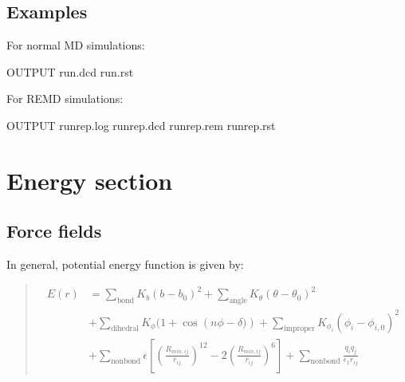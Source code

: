 \documentclass[a4paper,11pt,oneside,english]{sphinxmanual}
\begin{document}
\section{Examples}
\label{\detokenize{04_Output:examples}}
For normal MD simulations:

\begin{sphinxVerbatim}[commandchars=\\\{\}]
\PYG{o}{[}OUTPUT\PYG{o}{]}
  run.dcd
  run.rst
\end{sphinxVerbatim}

For REMD simulations:

\begin{sphinxVerbatim}[commandchars=\\\{\}]
\PYG{o}{[}OUTPUT\PYG{o}{]}
  run\PYGZus{}rep.log
  run\PYGZus{}rep.dcd
  run\PYGZus{}rep.rem
  run\PYGZus{}rep.rst
\end{sphinxVerbatim}


\chapter{Energy section}
\label{\detokenize{05_Energy:energy-section}}\label{\detokenize{05_Energy:energy}}\label{\detokenize{05_Energy::doc}}

\section{Force fields}
\label{\detokenize{05_Energy:force-fields}}
In general, potential energy function is given by:
\begin{quote}

\vspace{-5mm}
\begin{equation*}
\begin{split}E(r) & = \sum_{\mathrm{bond}}K_b(b-b_0)^2+\sum_{\mathrm{angle}}K_{\theta}(\theta-\theta_0)^2  \\
     & + \sum_{\mathrm{dihedral}}K_{\phi}(1+\cos\left(n\phi-\delta)\right)+\sum_{\mathrm{improper}}K_{\phi_i}(\phi_i-\phi_{i,0})^2 \\
     & + \sum_{\mathrm{nonbond}}\epsilon\left[\left(\frac{R_{min,ij}}{r_{ij}}\right)^{12}-2\left(\frac{R_{min,ij}}{r_{ij}}\right)^6\right]+\sum_{\mathrm{nonbond}}\frac{q_iq_j}{\epsilon_1r_{ij}}\end{split}
\end{equation*}
\vspace{-3mm}
\end{quote}
\end{document}
